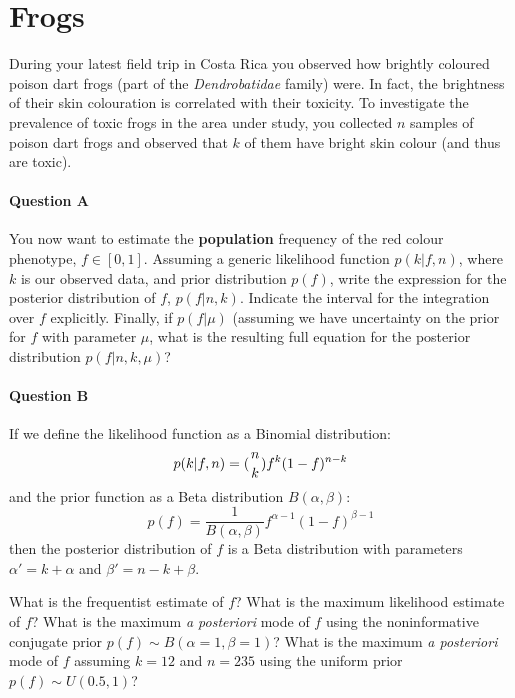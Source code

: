 
\section{Frogs}

        During your latest field trip in Costa Rica you observed how brightly coloured
        poison dart frogs (part of the \textit{Dendrobatidae} family) were.
        In fact, the brightness of their skin colouration is correlated with their toxicity.
        To investigate the prevalence of toxic frogs in the area under study, you collected
        $n$ samples of poison dart frogs and observed that $k$ of them have bright skin colour
        (and thus are toxic).

        \paragraph{Question A}

        You now want to estimate the \textbf{population} frequency of the red colour
        phenotype, $f \in [0,1]$.
        Assuming a generic likelihood function $p(k|f,n)$, where $k$ is our observed data,
        and prior distribution $p(f)$, write the expression for the posterior distribution
        of $f$, $p(f | n,k)$.
        Indicate the interval for the integration over $f$ explicitly.
        Finally, if $p(f|\mu)$ (assuming we have uncertainty on the prior for $f$
        with parameter $\mu$, what is the resulting full equation for the posterior
        distribution $p(f | n,k,\mu)$?

        \paragraph{Question B}

	If we define the likelihood function as a Binomial distribution:
        \begin{equation}
                p(k|f,n) = ( \genfrac{}{}{0pt}{}{n}{k} ) f^k(1-f)^{n-k}
        \end{equation}
        and the prior function as a Beta distribution $B(\alpha,\beta)$:
        \begin{equation}
                p(f) = \frac{1}{B(\alpha,\beta)} f^{\alpha-1}(1-f)^{\beta-1}
        \end{equation}
        then the posterior distribution of $f$ is a Beta distribution with
        parameters $\alpha'=k+\alpha$ and $\beta'=n-k+\beta$.

        What is the frequentist estimate of $f$?
        What is the maximum likelihood estimate of $f$?
        What is the maximum \textit{a posteriori} mode of $f$ using the noninformative
        conjugate prior $p(f) \sim B(\alpha=1,\beta=1)$?
        What is the maximum \textit{a posteriori} mode of $f$ assuming $k=12$ and $n=235$ using the
        uniform prior $p(f) \sim U(0.5,1)$?

